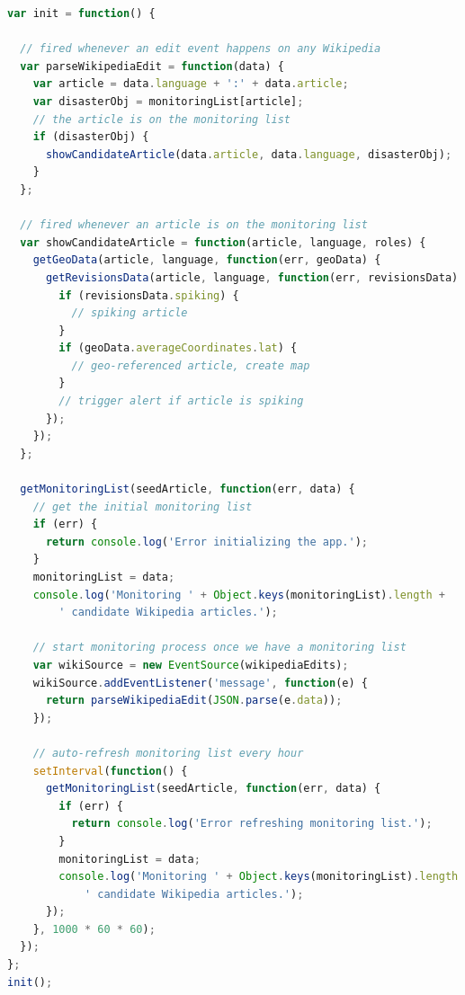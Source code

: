 \documentclass[runningheads,a4paper]{llncs}
\begin{document}
\begin{lstlisting}[caption={Main monitoring loop of the natural disaster monitor},
  label=listing:monitoring, language=JavaScript,
  float=b!, stringstyle=\color{gray},morekeywords={for,if,console,log,addEventListener,JSON,parse,stringify,forEach}]
var init = function() {

  // fired whenever an edit event happens on any Wikipedia
  var parseWikipediaEdit = function(data) {
    var article = data.language + ':' + data.article;
    var disasterObj = monitoringList[article];
    // the article is on the monitoring list
    if (disasterObj) {    
      showCandidateArticle(data.article, data.language, disasterObj);
    }
  };
  
  // fired whenever an article is on the monitoring list
  var showCandidateArticle = function(article, language, roles) {
    getGeoData(article, language, function(err, geoData) {
      getRevisionsData(article, language, function(err, revisionsData) {
        if (revisionsData.spiking) {
          // spiking article
        }
        if (geoData.averageCoordinates.lat) {
          // geo-referenced article, create map
        }
        // trigger alert if article is spiking
      });
    });
  };  

  getMonitoringList(seedArticle, function(err, data) {
    // get the initial monitoring list
    if (err) {
      return console.log('Error initializing the app.');
    }
    monitoringList = data;
    console.log('Monitoring ' + Object.keys(monitoringList).length +
        ' candidate Wikipedia articles.');
    
    // start monitoring process once we have a monitoring list
    var wikiSource = new EventSource(wikipediaEdits);
    wikiSource.addEventListener('message', function(e) {
      return parseWikipediaEdit(JSON.parse(e.data));
    });
    
    // auto-refresh monitoring list every hour
    setInterval(function() {
      getMonitoringList(seedArticle, function(err, data) {
        if (err) {
          return console.log('Error refreshing monitoring list.');
        }
        monitoringList = data;
        console.log('Monitoring ' + Object.keys(monitoringList).length +
            ' candidate Wikipedia articles.');
      });
    }, 1000 * 60 * 60);
  });
};
init();
\end{lstlisting}
\end{document}
